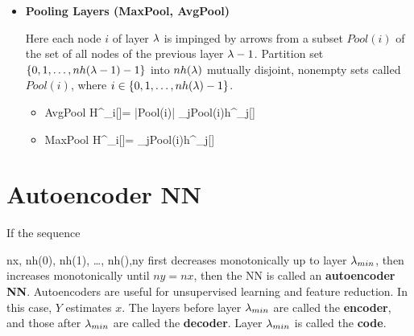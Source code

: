 \begin{itemize}
\begin{itemize}
\beq
nh()-1=nf-1 +
(nh(\lam)-1)\sigma
\;
\eeq
so
\beq
nh(\lam)=[nh()-
nf] + 1
\;.
\eeq
\item 2-dim

$h_i^\lam[\sigma]$ becomes
$h_{(i,j)}^\lam[\sigma]$.
Do 1-dim convolution
along both $i$ and $j$ axes.

\end{itemize}
\item{\bf Pooling Layers
(MaxPool, AvgPool)}

Here each node $i$
of layer $\lambda$ is impinged by
arrows from  a subset $Pool(i)$
of the set of all
nodes of the previous layer $\lambda-1$.
Partition set
$\{0,1,\dots,nh(\lambda-1)-1\}
$ into $nh(\lambda)$ mutually
disjoint, nonempty sets
called $Pool(i)$, where
$i\in \{0, 1, \ldots,nh(\lambda)-1\}$.

\begin{itemize}
\item AvgPool
\beq
H^\lam_i[\sigma]=
{|Pool(i)|}
\sum_{j\in Pool(i)}h^{}_j[\sigma]
\eeq
\item MaxPool
\beq
H^\lam_i[\sigma]=
\max_{j\in Pool(i)}h^{}_j[\sigma]
\eeq

\end{itemize}


\end{itemize}

\section{Autoencoder NN}


If the sequence

\beq
nx, nh(0), nh(1), \ldots,
nh(),ny
\eeq
first decreases monotonically
up to layer $\lambda_{min}$, then
increases monotonically until
$ny=nx$, then
the NN is called an {\bf
autoencoder NN}.
Autoencoders
are  useful for unsupervised learning
and
feature reduction. In this case,
$Y$ estimates $x$.
The layers before
layer $\lambda_{min}$
are called the {\bf encoder},
and those after
$\lambda_{min}$ are called the
{\bf decoder}.
Layer $\lambda_{min}$
is called the {\bf code}.
